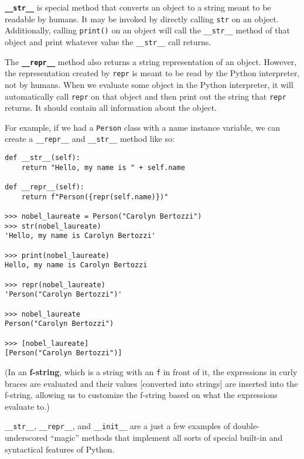 \textbf{\lstinline{__str__}} is special method that converts an object to a string meant to be readable by humans. It may be invoked by directly calling \lstinline{str} on an object. Additionally, calling \lstinline{print()} on an object will call the \lstinline{__str__} method of that object and print whatever value the \lstinline{__str__} call returns. 

The \textbf{\lstinline{__repr__}} method also returns a string representation of an object. However, the representation created by \lstinline{repr} is meant to be read by the Python interpreter, not by humans. When we evaluate some object in the Python interpreter, it will automatically call \lstinline{repr} on that object and then print out the string that \lstinline{repr} returns. It should contain all information about the object.

For example, if we had a \lstinline{Person} class with a name instance variable, we can create a \lstinline{__repr__} and \lstinline{__str__} method like so:
\begin{lstlisting}
def __str__(self):
    return "Hello, my name is " + self.name

def __repr__(self):
    return f"Person({repr(self.name)})"

>>> nobel_laureate = Person("Carolyn Bertozzi")
>>> str(nobel_laureate)
'Hello, my name is Carolyn Bertozzi'

>>> print(nobel_laureate)          
Hello, my name is Carolyn Bertozzi

>>> repr(nobel_laureate)
'Person("Carolyn Bertozzi")'

>>> nobel_laureate
Person("Carolyn Bertozzi")

>>> [nobel_laureate]
[Person("Carolyn Bertozzi")]
\end{lstlisting}

(In an \textbf{f-string}, which is a string with an \lstinline{f} in front of it, the expressions in curly braces are evaluated and their values [converted into strings] are inserted into the f-string, allowing us to customize the f-string based on what the expressions evaluate to.)

\lstinline{__str__}, \lstinline{__repr__}, and \lstinline{__init__} are a just a few examples of double-underscored ``magic'' methods that implement all sorts of special built-in and syntactical features of Python. 